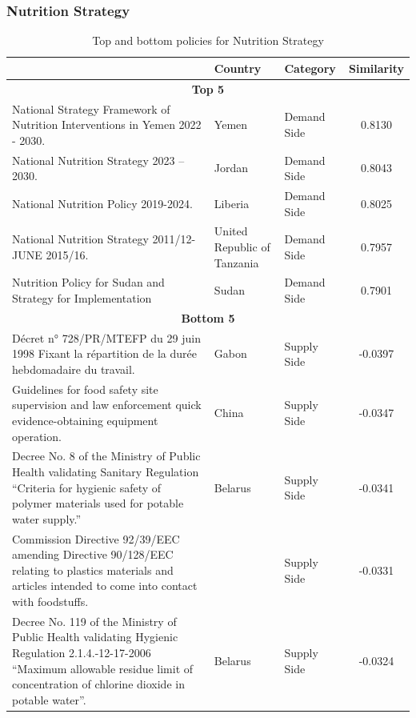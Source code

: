 \subsubsection{Nutrition Strategy}
\begin{table}[htbp]
\centering
\begin{tabular}{l l l c}
\toprule
 & Country & Category & Similarity \\
\midrule
\multicolumn{4}{c}{\textbf{Top 5}} \\
National Strategy Framework of Nutrition Interventions in Yemen 2022 - 2030. & Yemen & Demand Side & 0.8130 \\
National Nutrition Strategy 2023 – 2030. & Jordan & Demand Side & 0.8043 \\
National Nutrition Policy 2019-2024. & Liberia & Demand Side & 0.8025 \\
National Nutrition Strategy 2011/12-JUNE 2015/16. & United Republic of Tanzania & Demand Side & 0.7957 \\
Nutrition Policy for Sudan and Strategy for Implementation & Sudan & Demand Side & 0.7901 \\
\midrule
\multicolumn{4}{c}{\textbf{Bottom 5}} \\
Décret n° 728/PR/MTEFP du 29 juin 1998 Fixant la répartition de la durée hebdomadaire du travail. & Gabon & Supply Side & -0.0397 \\
Guidelines for food safety site supervision and law enforcement quick evidence-obtaining equipment operation. & China & Supply Side & -0.0347 \\
Decree No. 8 of the Ministry of Public Health validating Sanitary Regulation “Criteria for hygienic safety of polymer materials used for potable water supply.” & Belarus & Supply Side & -0.0341 \\
Commission Directive 92/39/EEC amending Directive 90/128/EEC relating to plastics materials and articles intended to come into contact with foodstuffs. &  & Supply Side & -0.0331 \\
Decree No. 119 of the Ministry of Public Health validating Hygienic Regulation 2.1.4.-12-17-2006 “Maximum allowable residue limit of concentration of chlorine dioxide in potable water”. & Belarus & Supply Side & -0.0324 \\
\bottomrule
\end{tabular}
\caption{Top and bottom policies for Nutrition Strategy}
\label{tab:top_bottom_nut}
\end{table}
